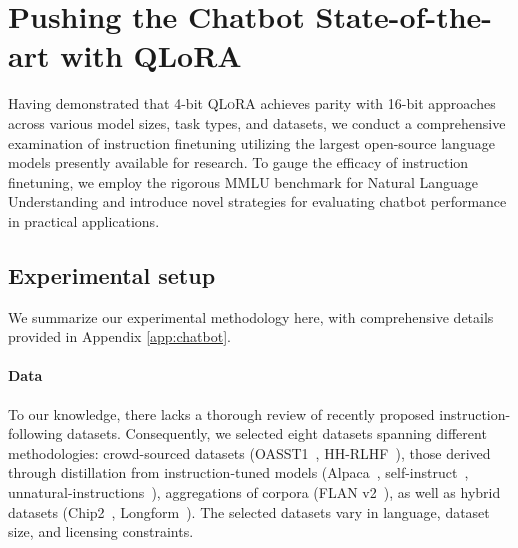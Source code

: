 \section{Pushing the Chatbot State-of-the-art with QLoRA}
\label{sec:pushing}
Having demonstrated that 4-bit \textsc{QLoRA} achieves parity with 16-bit approaches across various model sizes, task types, and datasets, we conduct a comprehensive examination of instruction finetuning utilizing the largest open-source language models presently available for research. To gauge the efficacy of instruction finetuning, we employ the rigorous MMLU benchmark for Natural Language Understanding and introduce novel strategies for evaluating chatbot performance in practical applications.

\subsection{Experimental setup} We summarize our experimental methodology here, with comprehensive details provided in Appendix \ref{app:chatbot}.

\paragraph{Data} To our knowledge, there lacks a thorough review of recently proposed instruction-following datasets. Consequently, we selected eight datasets spanning different methodologies: crowd-sourced datasets (OASST1~\citep{kopf2023openassistant}, HH-RLHF~\citep{bai2022training}), those derived through distillation from instruction-tuned models (Alpaca~\citep{alpaca}, self-instruct~\citep{wang2022self}, unnatural-instructions~\citep{honovich2022unnatural}), aggregations of corpora (FLAN v2~\citep{chung2022scaling}), as well as hybrid datasets (Chip2~\citep{laion2023}, Longform~\citep{koksal2023longform}). The selected datasets vary in language, dataset size, and licensing constraints.

